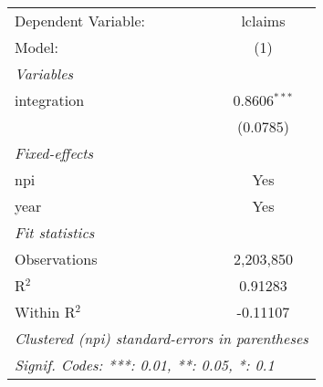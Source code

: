 
\begingroup
\centering
\begin{tabular}{lc}
   \tabularnewline \midrule \midrule
   Dependent Variable: & lclaims\\  
   Model:              & (1)\\  
   \midrule
   \emph{Variables}\\
   integration         & 0.8606$^{***}$\\   
                       & (0.0785)\\   
   \midrule
   \emph{Fixed-effects}\\
   npi                 & Yes\\  
   year                & Yes\\  
   \midrule
   \emph{Fit statistics}\\
   Observations        & 2,203,850\\  
   R$^2$               & 0.91283\\  
   Within R$^2$        & -0.11107\\  
   \midrule \midrule
   \multicolumn{2}{l}{\emph{Clustered (npi) standard-errors in parentheses}}\\
   \multicolumn{2}{l}{\emph{Signif. Codes: ***: 0.01, **: 0.05, *: 0.1}}\\
\end{tabular}
\par\endgroup


